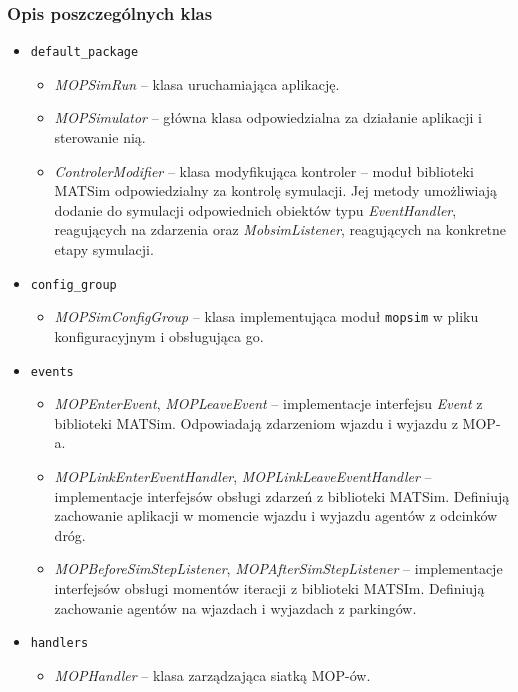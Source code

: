 \subsubsection{Opis poszczególnych klas}
\begin{itemize}
    \item \texttt{default\_package}
        \begin{itemize}
        \item \textit{MOPSimRun} -- klasa uruchamiająca aplikację.
        \item \textit{MOPSimulator} -- główna klasa odpowiedzialna za działanie aplikacji i sterowanie nią.
        \item \textit{ControlerModifier} -- klasa modyfikująca kontroler -- moduł biblioteki MATSim odpowiedzialny za kontrolę symulacji. Jej metody umożliwiają dodanie do symulacji odpowiednich obiektów typu \textit{EventHandler}, reagujących na zdarzenia oraz \textit{MobsimListener}, reagujących na konkretne etapy symulacji.
        \end{itemize}
    \item \texttt{config\_group}
        \begin{itemize}
            \item \textit{MOPSimConfigGroup} -- klasa implementująca moduł \texttt{mopsim} w pliku konfiguracyjnym i obsługująca go.
        \end{itemize}
    \item \texttt{events}
        \begin{itemize}
            \item \textit{MOPEnterEvent}, \textit{MOPLeaveEvent} -- implementacje interfejsu \textit{Event} z biblioteki MATSim. Odpowiadają zdarzeniom wjazdu i wyjazdu z MOP-a.
            \item \textit{MOPLinkEnterEventHandler}, \textit{MOPLinkLeaveEventHandler} -- implementacje interfejsów obsługi zdarzeń z biblioteki MATSim. Definiują zachowanie aplikacji w momencie wjazdu i wyjazdu agentów z odcinków dróg.
            \item \textit{MOPBeforeSimStepListener}, \textit{MOPAfterSimStepListener} -- implementacje interfejsów obsługi momentów iteracji z biblioteki MATSIm. Definiują zachowanie agentów na wjazdach i wyjazdach z parkingów.
        \end{itemize}
    \item \texttt{handlers}
        \begin{itemize}
            \item \textit{MOPHandler} -- klasa zarządzająca siatką MOP-ów.

\end{itemize}
\end{itemize}
